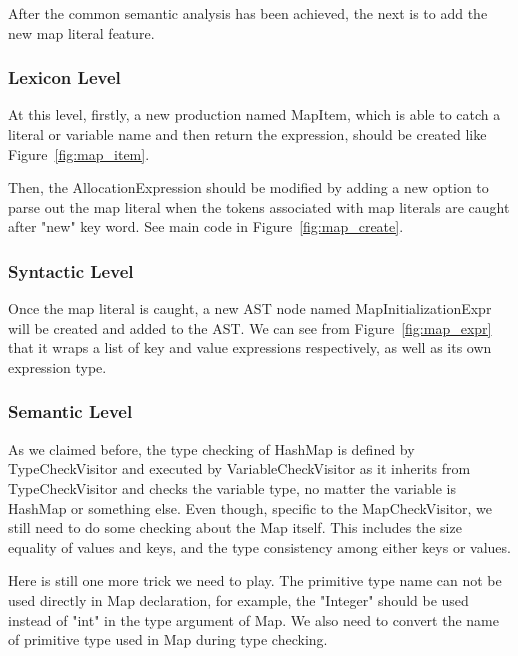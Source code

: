 	After the common semantic analysis has been achieved, the next is to add the new map literal feature.
	
	\subsubsection{Lexicon Level}
	
	
	At this level, firstly, a new production named MapItem, which is able to catch a literal or variable name and then return the expression, should be created like Figure~\ref{fig:map_item}.
	
	
	Then, the AllocationExpression should be modified by adding a new option to parse out the map literal when the tokens associated with map literals are caught after "new" key word. See main code in Figure~\ref{fig:map_create}.
	
	\subsubsection{Syntactic Level}
	
	
	Once the map literal is caught, a new AST node named MapInitializationExpr will be created and added to the AST. We can see from Figure~\ref{fig:map_expr} that it wraps a list of key and value expressions respectively, as well as its own expression type. 
	
	\subsubsection{Semantic Level}
	
	As we claimed before, the type checking of HashMap is defined by TypeCheckVisitor and executed by VariableCheckVisitor as it inherits from TypeCheckVisitor and checks the variable type, no matter the variable is HashMap or something else. Even though, specific to the MapCheckVisitor, we still need to do some checking about the Map itself. This includes the size equality of values and keys, and the type consistency among either keys or values.
	
	Here is still one more trick we need to play. The primitive type name can not be used directly in Map declaration, for example, the "Integer" should be used instead of "int" in the type argument of Map. We also need to convert the name of primitive type used in Map during type checking.
	
